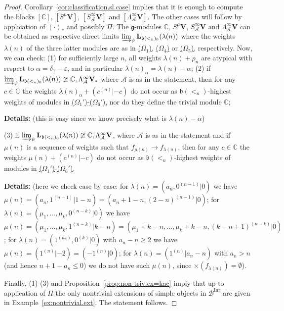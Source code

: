 \documentclass[12pt]{amsart}
\newcommand\C{\mathbb{C}}
\newcommand\g{\mathfrak{g}}
\newcommand\fb{\mathfrak{b}}
\newcommand\cA{\mathcal{A}}
\newcommand\cB{\mathcal{B}}
\newcommand\bV{\mathbf{V}}
\newcommand\bL{\mathbf{L}}
\DeclareMathOperator{\Int}{Int}
\theoremstyle{plain}
\theoremstyle{definition}
\numberwithin{equation}{section}
\newcommand{\details}[1]{\smallskip \color{blue} \begin{footnotesize} \textbf{Details:} #1 \end{footnotesize} \color{black}}
\newcommand{\details}[1]{}
\begin{document}
\begin{proof}
Corollary~\ref{cor:classification.sl.case} implies that it is enough to compute the blocks $[\C]$, $[S^\mu \bV]$, $[S_\cA^\infty \bV]$ and $[\Lambda_\cA^{\infty} \bV]$. The other cases will follow by application of $(\cdot)_*$ and possibly $\Pi$.  The $\g$-modules $\C$, $S^\mu \bV$, $S_\cA^\infty \bV$ and $\Lambda_\cA^{\infty} \bV$ can be obtained as respective direct limits $\varinjlim_\psi \bL_{\fb(<_n)_0}(\lambda(n))$ where the weights $\lambda(n)$ of the three latter modules are as in {\rm \hyperref[sym.type.mod]{($\Omega_1$)}, \hyperref[ext.type.mod.dual]{($\Omega_4$)}} or {\rm \hyperref[partition.type.mod]{($\Omega_5$)}}, respectively. Now, we can check: (1) for sufficiently large $n$, all weights $\lambda(n)+\rho_n$ are atypical with respect to $\alpha = \delta_1-\varepsilon$, and in particular $\lambda(n)_\alpha = \lambda(n)-\alpha$; (2) if $\varinjlim_\psi \bL_{\fb(<_n)_0}(\lambda(n))\ncong \C, \Lambda_\cA^{\infty} \bV_*$ where $\cA$ is as in the statement, then for any $c\in \C$ the weights $\lambda(n)_\alpha + (c^{(n)}|-c)$ do not occur as $\fb(<_n)$-highest weights of modules in {\rm \hyperref[sym.type.mod]{($\Omega_1'$)}-\hyperref[partition.type.mod.dual]{($\Omega_6'$)}}, nor do they define the trivial module $\C$; {\details{(this is easy since we know precisely what is $\lambda(n)-\alpha$)}} (3) if $\varinjlim_\psi \bL_{\fb(<_n)_0}(\lambda(n))\ncong \C, \Lambda_\cA^{\infty} \bV$, where $\cA$ is as in the statement and if $\mu(n)$ is a sequence of weights such that $f_{\mu(n)} \to f_{\lambda(n)}$, then for any $c\in \C$ the weights $\mu(n)+(c^{(n)}|-c)$ do not occur as $\fb(<_n)$-highest weights of modules in {\rm \hyperref[sym.type.mod]{($\Omega_1'$)}-\hyperref[partition.type.mod.dual]{($\Omega_6'$)}}. {\details{(here we check case by case: for $\lambda(n)=(a_n, 0^{(n-1)}|0)$ we have $\mu(n) = (a_n,1^{(n-1)}|1-n)=(a_n+1-n, (2-n)^{(n-1)}|0)$; for $\lambda(n)=(\mu_1,\ldots, \mu_k, 0^{(n-k)}|0)$ we have $\mu(n) = (\mu_1,\ldots, \mu_k, 1^{(n-k)}|k-n)= (\mu_1+k-n,\ldots, \mu_k+k-n, (k-n+1)^{(n-k)}|0)$; for $\lambda(n)=(1^{(a_n)}, 0^{(k)}|0)$ with $a_n-n\geq 2$ we have $\mu(n) = (1^{(n)}|-2)= (-1^{(n)}|0)$; for $\lambda(n)=(1^{(n)}|a_n-n)$ with $a_n>n$ (and hence $n+1-a_n\leq 0$) we do not have such $\mu(n)$, since $\times (f_{\lambda(n)})=\emptyset$).}} Finally, (1)-(3) and Proposition~\ref{prop:non-triv.ex=kac} imply that up to application of $\Pi$ the only nontrivial extensions of simple objects in $\cB^{\Int}$ are given in Example~\ref{ex:nontrivial.ext}. The statement follows.
\end{proof}
\end{document}
